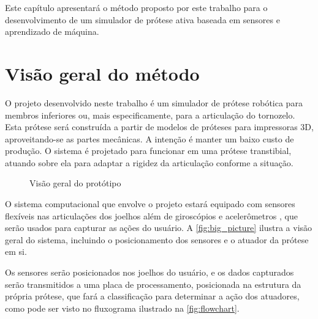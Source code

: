 Este capítulo apresentará o método proposto por este trabalho para o desenvolvimento de um simulador de prótese ativa baseada em sensores e aprendizado de máquina.

\section{Visão geral do método}\label{sec:metodo_protese}

O projeto desenvolvido neste trabalho é um simulador de prótese robótica para membros inferiores ou, mais especificamente, para a articulação do tornozelo. Esta prótese será construída a partir de modelos de próteses para impressoras 3D, aproveitando-se as partes mecânicas. A intenção é manter um baixo custo de produção. O sistema é projetado para funcionar em uma prótese transtibial, atuando sobre ela para adaptar a rigidez da articulação conforme a situação.

\begin{figure}[h]
	\caption{\label{fig:big_picture}Visão geral do protótipo}
	\begin{center}
	\end{center}
\end{figure}

O sistema computacional que envolve o projeto estará equipado com sensores flexíveis \cite{flex:datasheet} nas articulações dos joelhos além de giroscópios e acelerômetros \cite{invensense:imu_mpu}, que serão usados para capturar as ações do usuário. A \autoref{fig:big_picture} ilustra a visão geral do sistema, incluindo o posicionamento dos sensores e o atuador da prótese em si.

Os sensores serão posicionados nos joelhos do usuário, e os dados capturados serão transmitidos a uma placa de processamento, posicionada na estrutura da própria prótese, que fará a classificação para determinar a ação dos atuadores, como pode ser visto no fluxograma ilustrado na \autoref{fig:flowchart}.

